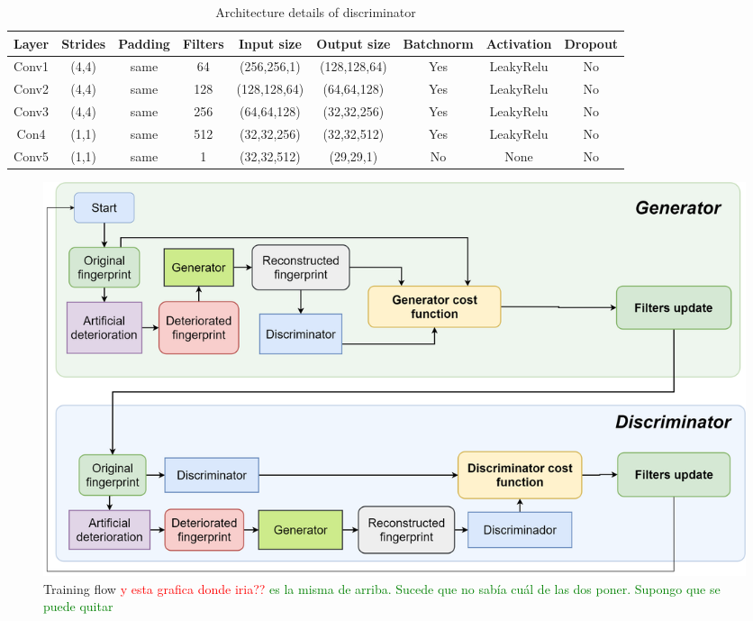 \documentclass[a4paper,fleqn]{cas-dc}
\begin{document}
\begin{table}[htbp]
\caption{Architecture details of discriminator}
\begin{tabular}{|c|c|c|c|c|c|c|c|c|}
\hline
{\color[HTML]{000000} \textbf{Layer}} &
  {\color[HTML]{000000} \textbf{Strides}} &
  {\color[HTML]{000000} \textbf{Padding}} &
  {\color[HTML]{000000} \textbf{Filters}} &
  {\color[HTML]{000000} \textbf{Input size}} &
  {\color[HTML]{000000} \textbf{Output size}} &
  {\color[HTML]{000000} \textbf{Batchnorm}} &
  {\color[HTML]{000000} \textbf{Activation}} &
  {\color[HTML]{000000} \textbf{Dropout}} \\ \hline
{\color[HTML]{000000} Conv1} &
  {\color[HTML]{000000} (4,4)} &
  {\color[HTML]{000000} same} &
  {\color[HTML]{000000} 64} &
  {\color[HTML]{000000} (256,256,1)} &
  {\color[HTML]{000000} (128,128,64)} &
  {\color[HTML]{000000} Yes} &
  {\color[HTML]{000000} LeakyRelu} &
  {\color[HTML]{000000} No} \\ \hline
{\color[HTML]{000000} Conv2} &
  {\color[HTML]{000000} (4,4)} &
  {\color[HTML]{000000} same} &
  {\color[HTML]{000000} 128} &
  {\color[HTML]{000000} (128,128,64)} &
  {\color[HTML]{000000} (64,64,128)} &
  {\color[HTML]{000000} Yes} &
  {\color[HTML]{000000} LeakyRelu} &
  {\color[HTML]{000000} No} \\ \hline
{\color[HTML]{000000} Conv3} &
  {\color[HTML]{000000} (4,4)} &
  {\color[HTML]{000000} same} &
  {\color[HTML]{000000} 256} &
  {\color[HTML]{000000} (64,64,128)} &
  {\color[HTML]{000000} (32,32,256)} &
  {\color[HTML]{000000} Yes} &
  {\color[HTML]{000000} LeakyRelu} &
  {\color[HTML]{000000} No} \\ \hline
{\color[HTML]{000000} Con4} &
  {\color[HTML]{000000} (1,1)} &
  {\color[HTML]{000000} same} &
  {\color[HTML]{000000} 512} &
  {\color[HTML]{000000} (32,32,256)} &
  {\color[HTML]{000000} (32,32,512)} &
  {\color[HTML]{000000} Yes} &
  {\color[HTML]{000000} LeakyRelu} &
  {\color[HTML]{000000} No} \\ \hline
{\color[HTML]{000000} Conv5} &
  {\color[HTML]{000000} (1,1)} &
  {\color[HTML]{000000} same} &
  {\color[HTML]{000000} 1} &
  {\color[HTML]{000000} (32,32,512)} &
  {\color[HTML]{000000} (29,29,1)} &
  {\color[HTML]{000000} No} &
  {\color[HTML]{000000} None} &
  {\color[HTML]{000000} No} \\ \hline
\end{tabular}
\label{tab2}
\end{table}

\begin{figure}[htbp]
\centerline{\includegraphics[scale=0.4]{figs/training_fd_en_h.png}}
\caption{Training flow \textcolor{red}{y esta grafica donde iria??} \textcolor{green}{es la misma de arriba. Sucede que no sabía cuál de las dos poner. Supongo que se puede quitar}}
\end{figure}
\end{document}
